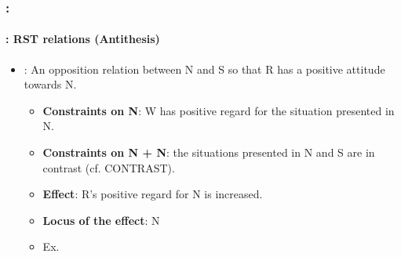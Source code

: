 \documentclass[xcolor=table]{beamer}
\begin{document}
\begin{frame}
	\frametitle{\insertshortsubtitle: \insertsection}
	\framesubtitle{\insertsubsection: RST relations (Antithesis)}
	
	\begin{itemize}
		\item {}: An opposition relation between N and S so that R has a positive attitude towards N.
		\begin{itemize}
			\item \textbf{Constraints on N}: W has positive regard for the situation presented in N.
			\item \textbf{Constraints on N + N}: the situations presented in N and S are in contrast (cf. CONTRAST).
			\item \textbf{Effect}: R's positive regard for N is increased.
			\item \textbf{Locus of the effect}: N
			\item Ex. 
		\end{itemize}
	\end{itemize}
	
\end{frame}
\end{document}
